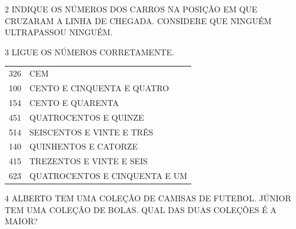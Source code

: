 

\num{2} INDIQUE OS NÚMEROS DOS CARROS NA POSIÇÃO EM QUE CRUZARAM A LINHA DE CHEGADA. CONSIDERE QUE NINGUÉM ULTRAPASSOU NINGUÉM.






\num{3} LIGUE OS NÚMEROS CORRETAMENTE.

\begin{longtable}[]{@{}ll@{}}
\toprule
326 & CEM\tabularnewline
100 & CENTO E CINQUENTA E QUATRO\tabularnewline
154 & CENTO E QUARENTA\tabularnewline
451 & QUATROCENTOS E QUINZE\tabularnewline
514 & SEISCENTOS E VINTE E TRÊS\tabularnewline
140 & QUINHENTOS E CATORZE\tabularnewline
415 & TREZENTOS E VINTE E SEIS\tabularnewline
623 & QUATROCENTOS E CINQUENTA E UM\tabularnewline
\bottomrule
\end{longtable}


\num{4} ALBERTO TEM UMA COLEÇÃO DE CAMISAS DE FUTEBOL. JÚNIOR TEM UMA COLEÇÃO DE BOLAS. QUAL DAS DUAS COLEÇÕES É A MAIOR?


